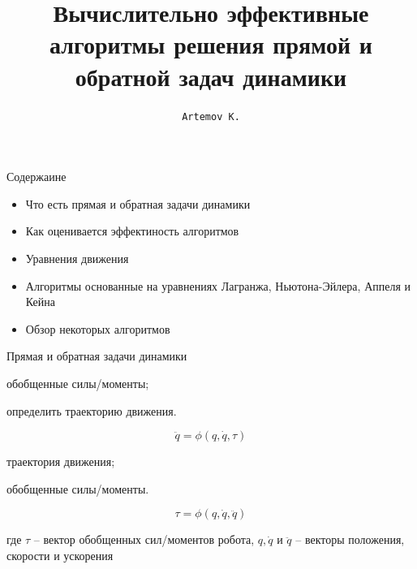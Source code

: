 \documentclass[newPxFont,numfooter,sectionpages]{beamer}
\title{Вычислительно эффективные алгоритмы решения прямой и обратной задач динамики}
\subtitle{}
\author{\texttt{Artemov K.}}
\begin{document}
\maketitle


\begin{frame}{Содержаине}
	\tableofcontents[hideallsubsections]
	\begin{itemize}
		\item 
		Что есть прямая и обратная задачи динамики
		\item Как оценивается эффектиность алгоритмов
		\item Уравнения движения
		\item Алгоритмы основанные на уравнениях Лагранжа, Ньютона-Эйлера, Аппеля и Кейна
		\item Обзор некоторых алгоритмов
		
	\end{itemize}	
\end{frame}

\begin{frame}{Прямая и обратная задачи динамики}
	\begin{minipage}{0.45\textwidth}
		\begin{center}
			
			 обобщенные силы/моменты;
			
			 определить траекторию движения.
			
			\begin{equation*}
			\ddot q = \phi(q, \dot q, \tau)
			\end{equation*}
		\end{center}
	
	\end{minipage}
	\hfill
	\begin{minipage}{0.45\textwidth}
		\begin{center}
			
			 траектория движения;
			
			 обобщенные силы/моменты.
			
			\begin{equation*}
			\tau = \phi(q, \dot q, \ddot q)
			\end{equation*}		
		\end{center}
	
	\end{minipage}
	\begin{center}
	где $\tau$ -- вектор обобщенных сил/моментов робота, $q, \dot q$ и $\ddot q$ -- векторы положения, скорости и ускорения
	\end{center}
\end{frame}
\end{document}
